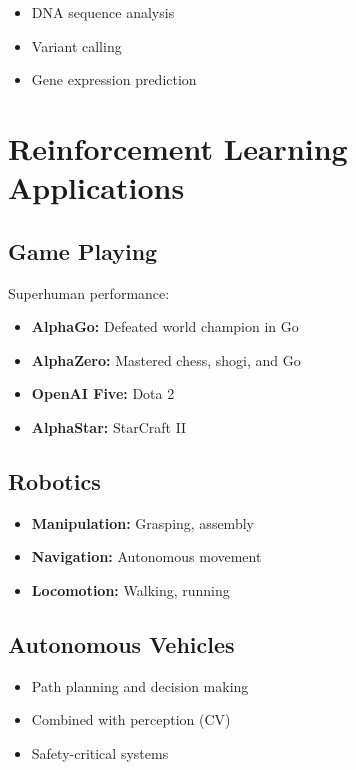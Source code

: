 \begin{itemize}
    \item DNA sequence analysis
    \item Variant calling
    \item Gene expression prediction
\end{itemize}

\section{Reinforcement Learning Applications}
\label{sec:rl-applications}

\subsection{Game Playing}

Superhuman performance:
\begin{itemize}
    \item \textbf{AlphaGo:} Defeated world champion in Go
    \item \textbf{AlphaZero:} Mastered chess, shogi, and Go
    \item \textbf{OpenAI Five:} Dota 2
    \item \textbf{AlphaStar:} StarCraft II
\end{itemize}

\subsection{Robotics}

\begin{itemize}
    \item \textbf{Manipulation:} Grasping, assembly
    \item \textbf{Navigation:} Autonomous movement
    \item \textbf{Locomotion:} Walking, running
\end{itemize}

\subsection{Autonomous Vehicles}

\begin{itemize}
    \item Path planning and decision making
    \item Combined with perception (CV)
    \item Safety-critical systems
\end{itemize}

